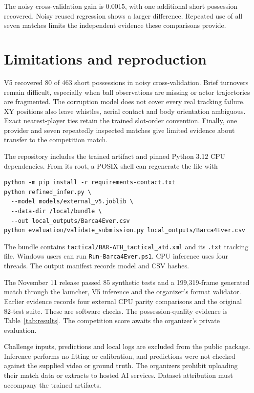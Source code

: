 \documentclass[11pt,a4paper]{article}
\begin{document}
\begin{samepage}
The noisy cross-validation gain is 0.0015, with one additional short possession
recovered. Noisy reused regression shows a larger difference. Repeated use of all
seven matches limits the independent evidence these comparisons provide.
\end{samepage}

\section{Limitations and reproduction}
V5 recovered 80 of 463 short possessions in noisy cross-validation. Brief
turnovers remain difficult, especially when ball observations are missing or
actor trajectories are fragmented. The corruption model does not cover every
real tracking failure. XY positions also leave whistles, aerial contact and body
orientation ambiguous. Exact nearest-player ties retain the trained slot-order
convention. Finally, one provider and seven repeatedly inspected matches give
limited evidence about transfer to the competition match.

The repository includes the trained artifact and pinned Python 3.12 CPU
dependencies. From its root, a POSIX shell can regenerate the file with
\begin{lstlisting}
python -m pip install -r requirements-contact.txt
python refined_infer.py \
  --model models/external_v5.joblib \
  --data-dir /local/bundle \
  --out local_outputs/Barca4Ever.csv
python evaluation/validate_submission.py local_outputs/Barca4Ever.csv
\end{lstlisting}
The bundle contains \texttt{tactical/BAR-ATH\_tactical\_atd.xml} and its
\texttt{.txt} tracking file. Windows users can run
\texttt{Run-Barca4Ever.ps1}. CPU inference uses four threads. The output manifest
records model and CSV hashes.

The November 11 release passed 85 synthetic tests and a 199,319-frame generated
match through the launcher, V5 inference and the organizer's format validator.
Earlier evidence records four external CPU parity comparisons and the original
82-test suite. These are software checks. The possession-quality evidence is
Table~\ref{tab:results}. The competition score awaits the organizer's private
evaluation.

Challenge inputs, predictions and local logs are excluded from the public
package. Inference performs no fitting or calibration, and predictions were not
checked against the supplied video or ground truth. The organizers prohibit
uploading their match data or extracts to hosted AI services. Dataset attribution
must accompany the trained artifacts.
\end{document}
